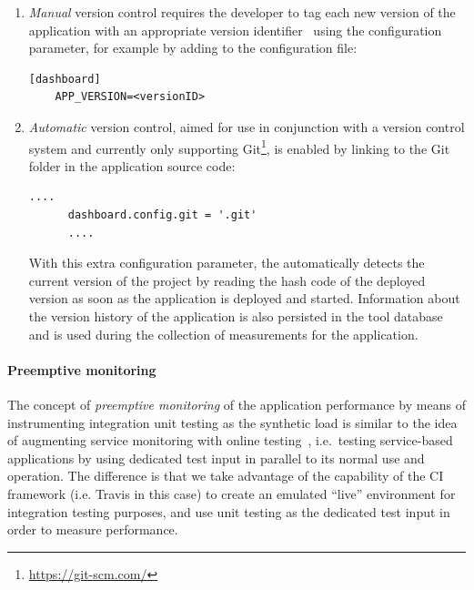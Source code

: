 \documentclass{sig-alternate-05-2015}
\begin{document}
\begin{enumerate}

  \item  \textit{Manual} version control requires the developer to tag each new version of the application with an appropriate version identifier~\cite{papazoglou2011managing} using the  configuration parameter, for example by adding to the configuration file:
  
    \begin{lstlisting}[style=custompython]
    [dashboard]
    APP_VERSION=<versionID>
    \end{lstlisting}


  \item \textit{Automatic} version control, aimed for use in conjunction with a version control system and currently only supporting Git\footnote{\url{https://git-scm.com/}}, is enabled by linking to the Git folder in the application source code: 
  
      \begin{lstlisting}[style=custompython]
      ....
      dashboard.config.git = '.git'
      ....
      \end{lstlisting}  
  
    With this extra configuration parameter, the \tool automatically detects the current version of the project by reading the hash code of the deployed version as soon as the application is deployed and started. Information about the version history of the application is also persisted in the tool database and is used during the collection of measurements for the application.


\end{enumerate}
  
  \paragraph{Preemptive monitoring}
  
  
  The concept of {\em preemptive monitoring} of the application performance by means of instrumenting integration unit testing as the synthetic load is similar to the idea of augmenting service monitoring with online testing~\cite{metzger2010proactive}, i.e.~testing service-based applications by using dedicated test input in parallel to its normal use and operation. The difference is that we take advantage of the capability of the CI framework (i.e. Travis in this case) to create an emulated ``live'' environment for integration testing purposes, and use unit testing as the dedicated test input in order to measure performance. 
  
\end{document}
